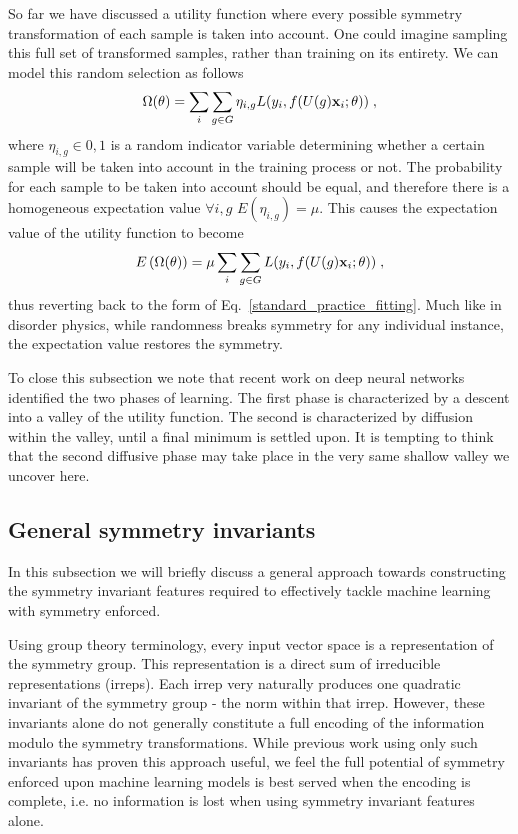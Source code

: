 \documentclass[twocolumn, nofootinbib, aps, prb]{revtex4-1}
\begin{document}
So far we have discussed a utility function where every possible symmetry transformation of each sample is taken into account. One could imagine sampling this full set of transformed samples, rather than training on its entirety. We can model this random selection as follows
\begin{equation}
\Omega({\bf \theta}) = \sum_i \sum_{g \in G} \eta_{i,g} L(y_i, f(U(g) {\bf x}_i; {\bf \theta}))
\; ,
\end{equation}
where $\eta_{i,g} \in {0,1}$ is a random indicator variable determining whether a certain sample will be taken into account in the training process or not. The probability for each sample to be taken into account should be equal, and therefore there is a homogeneous expectation value $\forall i, g \,\, E(\eta_{i,g}) = \mu$. This causes the expectation value of the utility function to become
\begin{equation}
E \left( \Omega({\bf \theta}) \right) = \mu \sum_i \sum_{g \in G} L(y_i, f(U(g) {\bf x}_i; {\bf \theta}))
\; ,
\end{equation}
thus reverting back to the form of Eq.~\eqref{standard_practice_fitting}.
Much like in disorder physics, while randomness breaks symmetry for any individual instance, the expectation value restores the symmetry.

To close this subsection we note that recent work on deep neural networks identified the two phases of learning\cite{shwartz1703opening}. The first phase is characterized by a descent into a valley of the utility function. The second is characterized by diffusion within the valley, until a final minimum is settled upon. It is tempting to think that the second diffusive phase may take place in the very same shallow valley we uncover here.


\subsection{General symmetry invariants}

In this subsection we will briefly discuss a general approach towards constructing the symmetry invariant features required to effectively tackle machine learning with symmetry enforced.

Using group theory terminology, every input vector space is a representation of the symmetry group. This representation is a direct sum of irreducible representations (irreps). Each irrep very naturally produces one quadratic invariant of the symmetry group - the norm within that irrep. However, these invariants alone do not generally constitute a full encoding of the information modulo the symmetry transformations. While previous work\cite{kazhdan2003rotation} using only such invariants has proven this approach useful, we feel the full potential of symmetry enforced upon machine learning models is best served when the encoding is complete, i.e. no information is lost when using symmetry invariant features alone.
\end{document}
